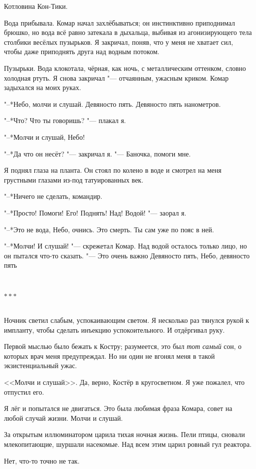 \documentclass[a4paper,10pt]{book}
\newcommand{\ldotst}{\so{...}\xspace}
\newcommand{\razd}{~\\{\centering\Large\bfseries$\ast \ast \ast$\par}~\\}
\begin{document}
Котловина Кон-Тики.

Вода прибывала. Комар начал захлёбываться; он инстинктивно приподнимал брюшко, 
но вода всё равно затекала в дыхальца, выбивая из агонизирующего тела столбики 
весёлых пузырьков. Я закричал, поняв, что у меня не хватает сил, чтобы даже 
приподнять друга над водным потоком.

Пузырьки. Вода клокотала, чёрная, как ночь, с металлическим оттенком, словно 
холодная ртуть. Я снова закричал "--- отчаянным, 
ужасным криком. Комар задыхался на моих руках.

"--*Небо, молчи и слушай. Девяносто пять. Девяносто пять нанометров.

"--*Что? Что ты говоришь? "--- плакал я.

"--*Молчи и слушай, Небо!

"--*Да что он несёт? "--- закричал я. "--- Баночка, помоги мне.

Я поднял глаза на планта. Он стоял по колено в воде и смотрел на меня грустными 
глазами из-под татуированных век.

"--*Ничего не сделать, командир.

"--*Просто! Помоги! Его! Поднять! Над! Водой! "--- заорал я.

"--*Это не вода, Небо, очнись. Это смерть. Ты сам уже по пояс в ней.

"--*Молчи! И слушай! "--- скрежетал Комар. Над водой осталось только лицо, но 
он пытался что-то сказать. "--- Это очень важно\ldotst Девяносто 
пять, Небо, девяносто пять\ldotst

\razd

Ночник светил слабым, успокаивающим светом. Я несколько раз тянулся рукой к 
импланту, чтобы сделать инъекцию успокоительного. И отдёргивал руку.

Первой мыслью было бежать к Костру; разумеется, это был \textit{тот самый} сон, 
о которых врач меня предупреждал. Но ни один не вгонял меня в такой 
экзистенциальный ужас.

<<Молчи и слушай>>. Да, верно, Костёр в кругосветном. Я уже пожалел, что
отпустил его.

Я лёг и попытался не двигаться. Это была любимая фраза Комара, совет на любой 
случай жизни. Молчи и слушай.

За открытым иллюминатором царила тихая ночная жизнь. Пели птицы, сновали 
млекопитающие, шуршали насекомые. Над всем этим царил ровный гул реактора.

Нет, что-то точно не так.
\end{document}
